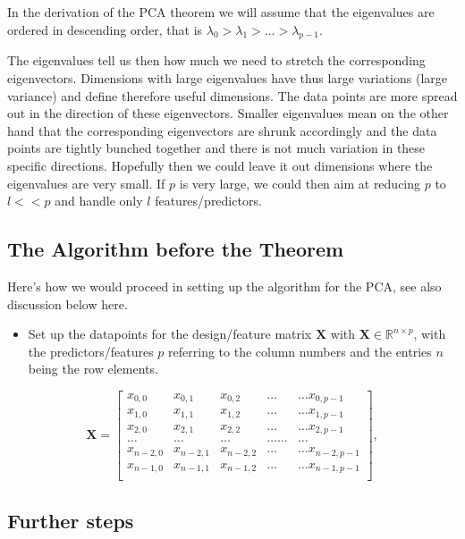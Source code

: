 \documentclass[%
oneside,                 %
final,                   %
10pt]{article}
\begin{document}
In the derivation of the PCA theorem we will assume that the eigenvalues are ordered in descending order, that is
$\lambda_0 > \lambda_1 > \dots > \lambda_{p-1}$. 

The eigenvalues tell us then how much we need to stretch the
corresponding eigenvectors. Dimensions with large eigenvalues have
thus large variations (large variance) and define therefore useful
dimensions. The data points are more spread out in the direction of
these eigenvectors.  Smaller eigenvalues mean on the other hand that
the corresponding eigenvectors are shrunk accordingly and the data
points are tightly bunched together and there is not much variation in
these specific directions. Hopefully then we could leave it out
dimensions where the eigenvalues are very small. If $p$ is very large,
we could then aim at reducing $p$ to $l << p$ and handle only $l$
features/predictors.

\subsection{The Algorithm before the Theorem}

Here's how we would proceed in setting up the algorithm for the PCA, see also discussion below here. 
\begin{itemize}
\item Set up the datapoints for the design/feature matrix $\bm{X}$ with $\bm{X}\in {\mathbb{R}}^{n\times p}$, with the predictors/features $p$  referring to the column numbers and the entries $n$ being the row elements.
\end{itemize}

\noindent
\[
\bm{X}=\begin{bmatrix}
x_{0,0} & x_{0,1} & x_{0,2}& \dots & \dots x_{0,p-1}\\
x_{1,0} & x_{1,1} & x_{1,2}& \dots & \dots x_{1,p-1}\\
x_{2,0} & x_{2,1} & x_{2,2}& \dots & \dots x_{2,p-1}\\
\dots & \dots & \dots & \dots \dots & \dots \\
x_{n-2,0} & x_{n-2,1} & x_{n-2,2}& \dots & \dots x_{n-2,p-1}\\
x_{n-1,0} & x_{n-1,1} & x_{n-1,2}& \dots & \dots x_{n-1,p-1}\\
\end{bmatrix},
\]

\subsection{Further steps}
\end{document}
